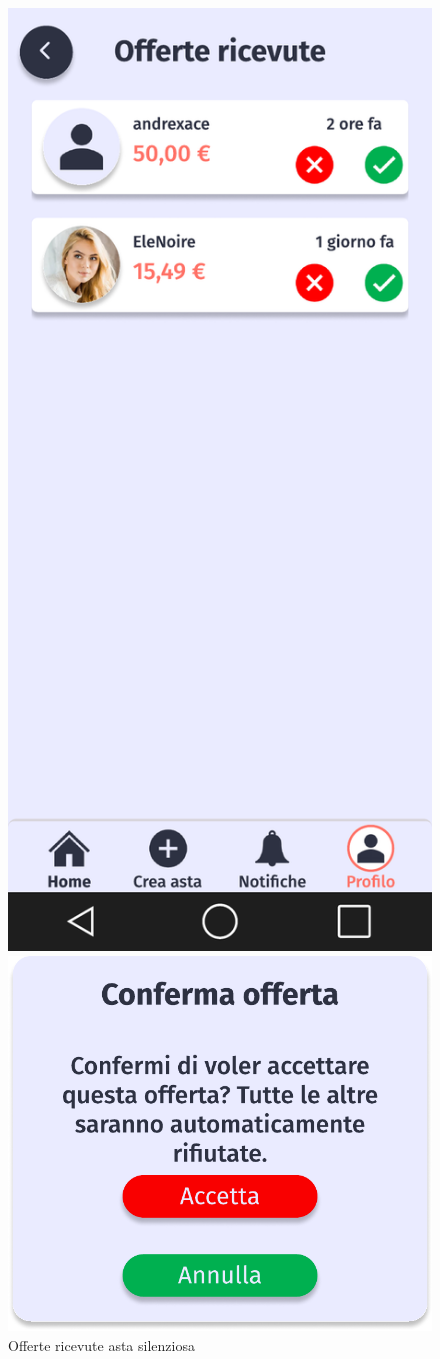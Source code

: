        \begin{figure}[!htb]
            \begin{minipage}{0.32\textwidth}
                \centering
                \includegraphics[width=.7\linewidth]{Immagini/Frames/Venditore/V13.pdf}
                \caption{Offerte ricevute asta silenziosa}
            \end{minipage}\hfill
            \begin{minipage}{0.32\textwidth}
                \centering
                \includegraphics[width=.7\linewidth]{Immagini/Frames/Popup/P7.pdf}

\end{minipage}
\end{figure}

